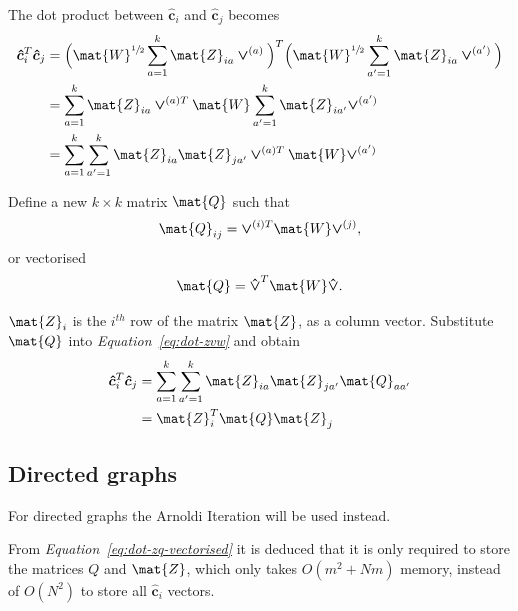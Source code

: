 \documentclass[12pt]{report}
\begin{document}
%
%


The dot product between $\bm{\hat{c}}_i$ and $\bm{\hat{c}}_j$ becomes
\begin{align}
  \bm{\hat{c}}^T_i \bm{\hat{c}}_j &=
    \Big(\mat{W}^{\sfrac{1}{2}} \sum_{a=1}^{k} \mat{Z}_{ia} \bm{\vee}^{(a)} \Big)^T
    \Big(\mat{W}^{\sfrac{1}{2}} \sum_{a'=1}^{k} \mat{Z}_{ia} \bm{\vee}^{(a')} \Big)
  \\
  &= \sum_{a=1}^{k} \mat{Z}_{ia} \bm{\vee}^{(a)T} \mat{W}
    \sum_{a'=1}^{k} \mat{Z}_{ia'} \bm{\vee}^{(a')}
  \\
  &= \sum_{a=1}^k \sum_{a'=1}^k \mat{Z}_{ia} \mat{Z}_{ja'}
    \bm{\vee}^{(a)T} \mat{W} \bm{\vee}^{(a')} \label{eq:dot-zvw}
\end{align}


%
%


Define a new $k \times k$ matrix $\mat{Q}$ such that
\begin{equation}
  \label{eq:q-ij}
  \mat{Q}_{ij} = \bm{\vee}^{(i)T} \mat{W} \bm{\vee}^{(j)},
\end{equation}
or vectorised
\begin{equation}
  \label{eq:q-vectorised}
  \mat{Q} = \bm{\hat{\vee}}^T \mat{W} \bm{\hat{\vee}}.
\end{equation}

$\mat{Z}_i$ is the $i^{th}$ row of the matrix $\mat{Z}$, as a column vector.
Substitute $\mat{Q}$ into \emph{Equation~\ref{eq:dot-zvw}} and obtain
\begin{align}
  \bm{\hat{c}}_i^T \bm{\hat{c}}_j &= \sum_{a=1}^k \sum_{a'=1}^k
    \mat{Z}_{ia} \mat{Z}_{ja'} \mat{Q}_{aa'} \label{eq:dot-zq-sum} \\
  &= \mat{Z}_i^T \mat{Q} \mat{Z}_j \label{eq:dot-zq-vectorised}
\end{align}


\subsection{Directed graphs}


For directed graphs the Arnoldi Iteration \cite{lehoucq1996deflation} will be used
instead.

%
%
From \emph{Equation~\ref{eq:dot-zq-vectorised}} it is deduced that it is only
required to store the matrices $Q$ and $\mat{Z}$, which only takes $O(m^2 + Nm)$ memory,
instead of $O(N^2)$ to store all $\bm{\hat{c}}_i$ vectors.
\end{document}
